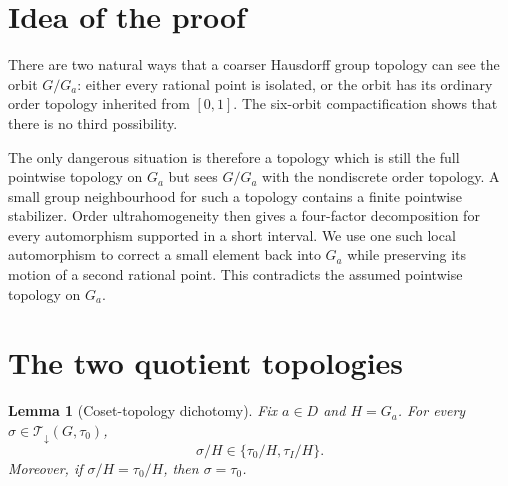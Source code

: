 \documentclass[11pt]{article}
\newtheorem{lemma}{Lemma}
\newcommand{\Tdown}{\mathcal T_{\downarrow}}
\begin{document}
\section*{Idea of the proof}

There are two natural ways that a coarser Hausdorff group topology can see
the orbit $G/G_a$: either every rational point is isolated, or the orbit has
its ordinary order topology inherited from $[0,1]$.  The six-orbit
compactification shows that there is no third possibility.

The only dangerous situation is therefore a topology which is still the
full pointwise topology on $G_a$ but sees $G/G_a$ with the nondiscrete order
topology.  A small group neighbourhood for such a topology contains a finite
pointwise stabilizer.  Order ultrahomogeneity then gives a four-factor
decomposition for every automorphism supported in a short interval.  We use
one such local automorphism to correct a small element back into $G_a$ while
preserving its motion of a second rational point.  This contradicts the
assumed pointwise topology on $G_a$.

\section*{The two quotient topologies}

\begin{lemma}[Coset-topology dichotomy]\label{lem:dichotomy}
Fix $a\in D$ and $H=G_a$.  For every
$\sigma\in\Tdown(G,\tau_0)$,
\[
 \sigma/H\in\{\tau_0/H,\tau_I/H\}.
\]
Moreover, if $\sigma/H=\tau_0/H$, then $\sigma=\tau_0$.
\end{lemma}
\end{document}
